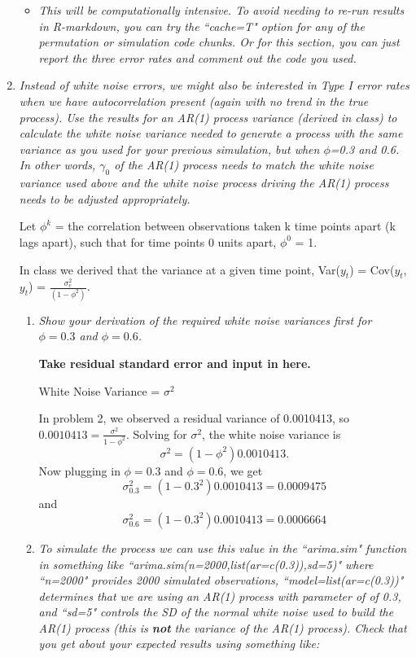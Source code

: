 \documentclass[11pt]{article}\usepackage[]{graphicx}\usepackage[]{color}
\begin{document}
\begin{enumerate}
\begin{itemize}
\item%
{\it This will be computationally intensive. To avoid needing to re-run results in R-markdown, you can try the ``cache=T" option for any of the permutation or simulation code chunks. Or for this section, you can just report the three error rates and comment out the code you used.}

\end{itemize}

\item%
{\it Instead of white noise errors, we might also be interested in Type I error rates when we have autocorrelation present (again with no trend in the true process). Use the results for an AR(1) process variance (derived in class) to calculate the white noise variance needed to generate a process with the same variance as you used for your previous simulation, but when $\phi$=0.3 and 0.6. In other words, $\gamma_0$ of the AR(1) process needs to match the white noise variance used above and the white noise process driving the AR(1) process needs to be adjusted appropriately.}

Let $\phi^{k}$ = the correlation between observations taken k time points apart (k lags apart), such that for time points 0 units apart, $\phi^{0}$ = 1.

In class we derived that the variance at a given time point, Var($y_{t}$) = Cov($y_{t}$,$y_{t}$) = $\frac{\sigma^2_{e}}{(1-\phi^2)}$.


\begin{enumerate}
\item%
{\it Show your derivation of the required white noise variances first for $\phi=0.3$ and $\phi=0.6$.}

{\bf Take residual standard error and input in here.}

White Noise Variance = $\sigma^2$

In problem 2, we observed a residual variance of 0.0010413, so $0.0010413 = \frac{\sigma^2}{1-\phi^2}$. Solving for $\sigma^2$, the white noise variance is
$$
\sigma^2 = (1-\phi^2) 0.0010413.
$$
Now plugging in $\phi=0.3$ and $\phi=0.6$, we get
$$\sigma^2_{0.3} = (1-0.3^2) 0.0010413 = 0.0009475$$
and
$$\sigma^2_{0.6} = (1-0.3^2) 0.0010413 = 0.0006664$$

\item%
{\it To simulate the process we can use this value in the ``arima.sim" function in something like ``arima.sim(n=2000,list(ar=c(0.3)),sd=5)" where ``n=2000" provides 2000 simulated observations, ``model=list(ar=c(0.3))" determines that we are using an AR(1) process with parameter of of 0.3, and ``sd=5" controls the SD of the normal white noise used to build the AR(1) process (this is {\bf not} the variance of the AR(1) process). Check that you get about your expected results using something like:}


\end{enumerate}
\end{enumerate}
\end{document}
